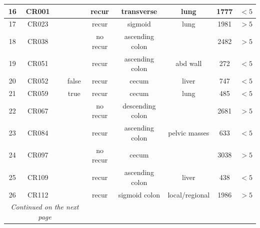 \begin{table}
\begin{longtable}{|c|c|c|c|c|c|c|c|c|}
\hline
16 & CR001 &  &  & recur & transverse  & lung & 1777 & $<5$ \\
\hline
17 & CR023 &  &  & recur & sigmoid & lung & 1981 & $>5$ \\
\hline
18 & CR038 &  &  & no recur & ascending colon &  & 2482 & $>5$ \\
\hline
19 & CR051 &  &  & recur & ascending colon & abd wall & 272 & $<5$ \\
\hline
20 & CR052 &  & false & recur & cecum & liver & 747 & $<5$ \\
\hline
21 & CR059 &  & true & recur & cecum & lung & 485 & $<5$ \\
\hline
22 & CR067 & & & no recur & descending colon &  & 2681 & $>5$ \\
\hline
23 & CR084 & & & recur & ascending colon & pelvic masses & 633 & $<5$ \\

\hline
24 & CR097 & & & no recur & cecum &  & 3038 & $>5$ \\
\hline
25 & CR109 & & & recur & ascending colon & liver & 438 & $<5$ \\
\hline
26 & CR112 & & & recur & sigmoid colon & local/regional & 1986 & $>5$ \\
\hline
\multicolumn{4}{c}{\textit{Continued on the next page}} \\
  \end{longtable}
  \label{table:Chapt4_IMC_patient_metadata}
\end{table}

